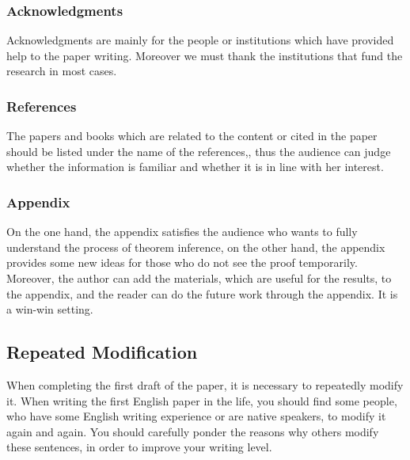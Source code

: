 \subsubsection{Acknowledgments}
Acknowledgments are mainly for the people or institutions which have provided help to the paper writing. Moreover we must thank the institutions that fund the research in most cases.

\subsubsection{References}
The papers and books which are related to the content or cited in the paper should be listed under the name of the references,, thus the audience can judge whether the information is familiar and whether it is in line with her interest.

\subsubsection{Appendix}
On the one hand, the appendix satisfies the audience who wants to fully understand the process of theorem inference, on the other hand, the appendix provides some new ideas for those who do not see the proof temporarily. Moreover, the author can add the materials, which are useful for the results, to the appendix, and the reader can do the future work through the appendix. It is a win-win setting.

\subsection{Repeated Modification}
When completing the first draft of the paper, it is necessary to repeatedly modify it. When writing the first English paper in the life, you should find some people, who have some English writing experience or are native speakers, to modify it again and again. You should carefully ponder the reasons why others modify these sentences, in order to improve your writing level.



\nocite{2013数学之英文写作}

